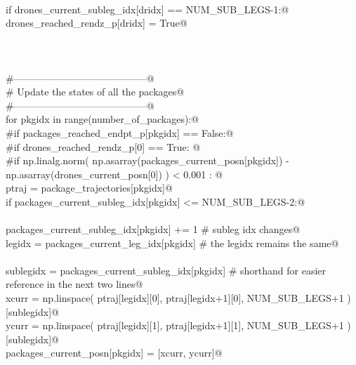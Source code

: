 \documentclass[10.0pt]{report}
\begin{document}
\begin{appendices}
\begin{flushleft}
\begin{list}{}{}
\mbox{}\verb@@\\
\mbox{}\verb@                    if drones_current_subleg_idx[dridx] == NUM_SUB_LEGS-1:@\\
\mbox{}\verb@                        drones_reached_rendz_p[dridx] = True@\\
\mbox{}\verb@@\\
\mbox{}\verb@@\\
\mbox{}\verb@@\\
\mbox{}\verb@        #-----------------------------------------@\\
\mbox{}\verb@        # Update the states of all the packages@\\
\mbox{}\verb@        #-----------------------------------------@\\
\mbox{}\verb@        for pkgidx in range(number_of_packages):@\\
\mbox{}\verb@            #if packages_reached_endpt_p[pkgidx] == False:@\\
\mbox{}\verb@              #if drones_reached_rendz_p[0] == True:  @\\
\mbox{}\verb@              #if  np.linalg.norm( np.asarray(packages_current_posn[pkgidx]) - np.asarray(drones_current_posn[0]) ) < 0.001 :  @\\
\mbox{}\verb@                  ptraj = package_trajectories[pkgidx]@\\
\mbox{}\verb@                  if packages_current_subleg_idx[pkgidx] <= NUM_SUB_LEGS-2:@\\
\mbox{}\verb@@\\
\mbox{}\verb@                    packages_current_subleg_idx[pkgidx] += 1     # subleg idx changes@\\
\mbox{}\verb@                    legidx    = packages_current_leg_idx[pkgidx] # the legidx remains the same@\\
\mbox{}\verb@@\\
\mbox{}\verb@                    sublegidx = packages_current_subleg_idx[pkgidx] # shorthand for easier reference in the next two lines@\\
\mbox{}\verb@                    xcurr = np.linspace( ptraj[legidx][0], ptraj[legidx+1][0], NUM_SUB_LEGS+1 )[sublegidx]@\\
\mbox{}\verb@                    ycurr = np.linspace( ptraj[legidx][1], ptraj[legidx+1][1], NUM_SUB_LEGS+1 )[sublegidx]@\\
\mbox{}\verb@                    packages_current_posn[pkgidx]  = [xcurr, ycurr]@\\
\mbox{}\verb@@\\

\end{list}
\end{flushleft}
\end{appendices}
\end{document}
